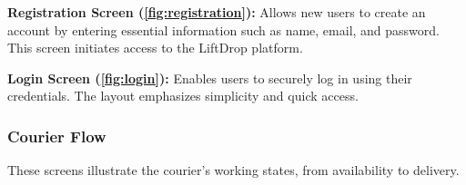 \textbf{Registration Screen (\ref{fig:registration}):}  
Allows new users to create an account by entering essential information such as name, email, and password. This screen initiates access to the LiftDrop platform.

\textbf{Login Screen (\ref{fig:login}):}  
Enables users to securely log in using their credentials. The layout emphasizes simplicity and quick access.


\subsubsection{Courier Flow}

These screens illustrate the courier's working states, from availability to delivery.

\begin{figure}[H]
    \centering
    \begin{subfigure}[b]{0.48\textwidth}
        \centering

\end{subfigure}
\end{figure}
